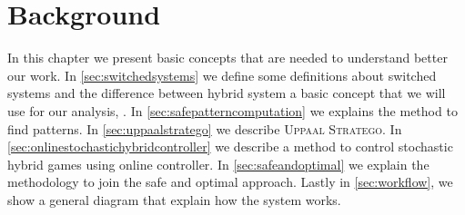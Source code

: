 \chapter{Background}
\label{ch:background}
In this chapter we present basic concepts that are needed 
to understand better our work. In \autoref{sec:switchedsystems} 
we define some definitions about switched systems and the 
difference between hybrid system a basic concept that we 
will use for our analysis, \cite{sanfelice2020hybrid}. 
In \autoref{sec:safepatterncomputation} we explains the method 
to find patterns. In \autoref{sec:uppaalstratego} we describe 
\textsc{Uppaal Stratego}. In \autoref{sec:onlinestochastichybridcontroller}
 we describe a method to control stochastic hybrid games using online 
 controller. In \autoref{sec:safeandoptimal} we explain the 
 methodology to join the safe and optimal approach. Lastly in 
\autoref{sec:workflow}, we show a general diagram that explain 
how the system works.
\clearpage
